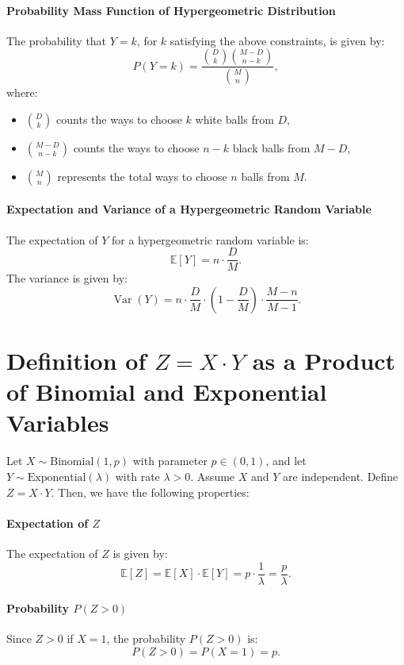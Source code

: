 \paragraph{Probability Mass Function of Hypergeometric Distribution}
The probability that \( Y = k \), for \( k \) satisfying the above constraints, is given by:
\[
P(Y = k) = \frac{\binom{D}{k} \binom{M - D}{n - k}}{\binom{M}{n}},
\]
where:
\begin{itemize}
    \item \( \binom{D}{k} \) counts the ways to choose \( k \) white balls from \( D \),
    \item \( \binom{M - D}{n - k} \) counts the ways to choose \( n - k \) black balls from \( M - D \),
    \item \( \binom{M}{n} \) represents the total ways to choose \( n \) balls from \( M \).
\end{itemize}

\paragraph{Expectation and Variance of a Hypergeometric Random Variable}
The expectation of \( Y \) for a hypergeometric random variable is:
\[
\mathbb{E}[Y] = n \cdot \frac{D}{M}.
\]
The variance is given by:
\[
\operatorname{Var}(Y) = n \cdot \frac{D}{M} \cdot \left(1 - \frac{D}{M}\right) \cdot \frac{M - n}{M - 1}.
\]

\section{Definition of \( Z = X \cdot Y \) as a Product of Binomial and Exponential Variables}
Let \( X \sim \text{Binomial}(1, p) \) with parameter \( p \in (0, 1) \), and let \( Y \sim \text{Exponential}(\lambda) \) with rate \( \lambda > 0 \). Assume \( X \) and \( Y \) are independent. Define \( Z = X \cdot Y \). Then, we have the following properties:

\paragraph{Expectation of \( Z \)}
The expectation of \( Z \) is given by:
\[
\mathbb{E}[Z] = \mathbb{E}[X] \cdot \mathbb{E}[Y] = p \cdot \frac{1}{\lambda} = \frac{p}{\lambda}.
\]

\paragraph{Probability \( P(Z > 0) \)}
Since \( Z > 0 \) if \( X = 1 \), the probability \( P(Z > 0) \) is:
\[
P(Z > 0) = P(X = 1) = p.
\]


